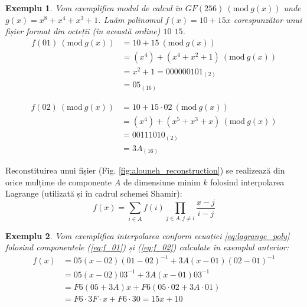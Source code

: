 \documentclass[oneside, 12pt]{book}
\newcommand{\Mod}[1]{\ (\text{mod}\ #1)}
\newtheorem{exemplu}{\textbf{Exemplu}}[section]
\begin{document}
\begin{exemplu}
Vom exemplifica modul de calcul în $GF(256) \Mod {g(x)} $ unde $g(x) = x ^ 8 + x ^ 4 + x ^ 3 + 1$. Luăm polinomul $f(x) = 10 + 15x$ corespunzător unui fișier format din octeții (în această ordine) $10$ $15$.
	\begin{equation} \label{eq:f_01}
	\begin{split}
		f(01) \Mod{g(x)} & = 10 + 15 \Mod{g(x)} \\
		& = (x ^ 4) + (x ^ 4 + x ^ 2 + 1) \Mod{g(x)} \\
		& = x ^ 2 + 1 = 000000101_{(2)} \\
		& =  05_{(16)}
	\end{split}
	\end{equation}

	\begin{equation} \label{eq:f_02}
	\begin{split}
	 f(02) \Mod{g(x)} & = 10 + 15\cdot02 \Mod{g(x)} \\
	 & = (x ^ 4) + (x ^ 5 + x ^ 3 + x) \Mod{g(x)} \\
	 & = 00111010_{(2)} \\
	 & = 3A_{(16)}
	 \end{split}
	 \end{equation}
\end{exemplu}
Reconstituirea unui fișier (Fig. \ref{fig:alouneh_reconstruction}) se realizează din orice mulțime de componente $A$ de dimensiune minim $k$ folosind interpolarea Lagrange (utilizată și în cadrul schemei Shamir):
\begin{equation}
	\label{eq:lagrange_poly}
	f(x)=\sum_{i \in A} f(i) \prod_{j \in A, j \neq i} \frac{x-j}{i-j}
\end{equation}

\begin{exemplu}
Vom exemplifica interpolarea conform ecuației {\ref{eq:lagrange_poly}} folosind componentele (\ref{eq:f_01}) și (\ref{eq:f_02}) calculate în exemplul anterior:
	\begin{equation}
	\begin{split}
		f(x) & = 05(x - 02)(01 - 02)^{-1} + 3A(x - 01)(02 - 01)^{-1} \\
		& = 05(x - 02)03^{-1} + 3A(x - 01)03^{-1} \\
		& = F6(05 + 3A)x + F6(05\cdot02 + 3A \cdot 01) \\
		& = F6\cdot 3F\cdot x + F6\cdot30 = 15x + 10
	\end{split}
	\end{equation}
\end{exemplu}
\end{document}
